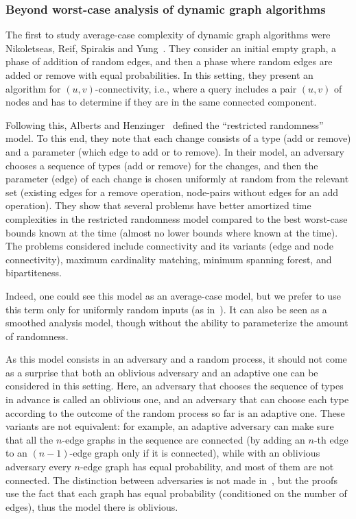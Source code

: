 \subsubsection{Beyond worst-case analysis of dynamic graph algorithms}

The first to study average-case complexity of dynamic graph algorithms were 
Nikoletseas, Reif, Spirakis and Yung~\cite{NikoletseasRSY95}.
They consider an initial empty graph, a phase of addition of random edges, and then a phase where random edges are added or remove with equal probabilities. 
In this setting, they present an algorithm for $(u,v)$-connectivity, i.e., where a query includes a pair $(u,v)$ of nodes and has to determine if they are in the same connected component.

Following this, Alberts and Henzinger~\cite{AlbertsH98} 
defined the ``restricted randomness'' model.
To this end, they note that each change consists of a type (add or remove) and a parameter (which edge to add or to remove).
In their model, an adversary chooses a sequence of types (add or remove) for the changes,
and then the parameter (edge) of each change is chosen uniformly at random from the relevant set (existing edges for a remove operation, node-pairs without edges for an add operation).
They show that several problems have better amortized time complexities in the restricted randomness model compared to the best worst-case bounds known at the time (almost no lower bounds where known at the time).
The problems considered include connectivity and its variants (edge and node connectivity), 
maximum cardinality matching, 
minimum spanning forest, and bipartiteness. 

Indeed, one could see this model as an average-case model, but we prefer to use this term only for uniformly random inputs (as in~\cite{NikoletseasRSY95,HLS22}). 
It can also be seen as a smoothed analysis model, though without the ability to parameterize the amount of randomness.

As this model consists in an adversary and a random process, it should not come as a surprise that both an oblivious adversary and an adaptive one can be considered in this setting.
Here, an adversary that chooses the sequence of types in advance is called an oblivious one, and an adversary that can choose each type according to the outcome of the random process so far is an adaptive one.
These variants are not equivalent:
for example, an adaptive adversary can make sure that all the $n$-edge graphs in the sequence are connected (by adding an $n$-th edge to an $(n-1)$-edge graph only if it is connected), while with an oblivious adversary every $n$-edge graph has equal probability, and most of them are not connected.
The distinction between adversaries is not made in~\cite{AlbertsH98}, but the proofs use the fact that each graph has equal probability (conditioned on the number of edges), thus the model there is oblivious.
 
